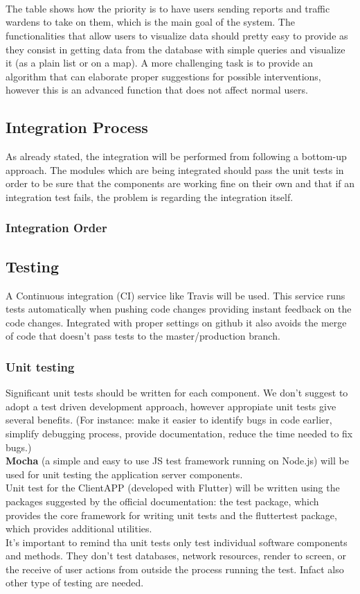 \documentclass{article}
\begin{document}
\\ \\ \\
The table shows how the priority is to have users sending reports and traffic wardens to take on them, which is the  main goal of the system.
The functionalities that allow users to visualize data should pretty easy to provide as they consist in getting data from the database with simple queries and visualize it (as a plain list or on a map).
A more challenging task is to provide an algorithm that can elaborate proper suggestions for possible interventions, however this is an advanced function that does not affect normal users.

\subsection{Integration Process}
As already stated, the integration will be performed from following a bottom-up approach.
The modules which are being integrated should pass the unit tests in order to be sure that the components are working fine on
their own and that if an integration test fails, the problem is regarding the integration itself.
\subsubsection{Integration Order}


\subsection{Testing}
A Continuous integration (CI) service like Travis will be used. This service runs tests automatically when pushing code changes providing instant feedback on the code changes. Integrated with proper settings on github it also avoids the merge of code that doesn't pass tests to the master/production branch.
\subsubsection{Unit testing}
Significant unit tests should be written for each component. We don't suggest to adopt a test driven development approach, however appropiate unit tests give several benefits.
(For instance: make it easier to identify bugs in code earlier, simplify debugging process, provide documentation, reduce the time needed to fix bugs.)\\
\textbf{Mocha} (a simple and easy to use JS test framework running on Node.js) will be used for unit testing the application server components.\\
Unit test for the ClientAPP  (developed with Flutter) will be written using the packages suggested by the official documentation: the test package, which provides the core framework for writing unit tests and the fluttertest package, which provides additional utilities.\\
It's important to remind tha unit tests only test individual software components and methods. They don't test databases, network resources, render to screen, or the receive of user actions from outside the process running the test.
Infact also other type of testing are needed.
\end{document}
